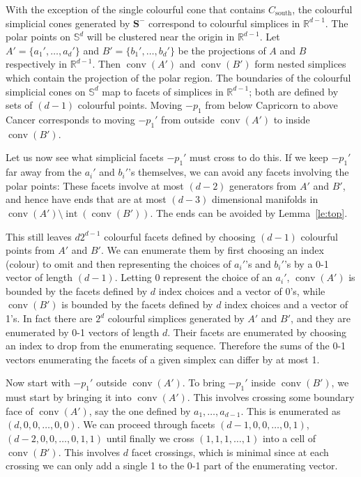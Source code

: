 \documentclass[epsbox,12pt,reqno]{amsart}
\theoremstyle{definition}
\theoremstyle{remark}
\def\S{\mathbf{S}}
\def\conv{\operatorname{conv}}
\def\south{\operatorname{south}}
\def\interior{\operatorname{int}}
\def\R{\mathbb{R}}
\def\Sph{\mathbb{S}}
\begin{document}
With the exception of the single colourful cone that contains
$C_{\south}$, the colourful simplicial cones generated by $\S^\minus$
correspond to colourful simplices in $\R^{d-1}$.  
The polar points on $\Sph^d$ will be clustered near the origin
in $\R^{d-1}$.  Let $A'=\{a_1', \ldots, a_d'\}$ and 
$B'=\{b_1', \ldots, b_d'\}$ be the projections of $A$ and $B$
respectively in $\R^{d-1}$.  
Then $\conv(A')$ and $\conv(B')$ form nested simplices which contain
the projection of the polar region.   The boundaries of the colourful 
simplicial cones on $\Sph^d$ map to facets of simplices in $\R^{d-1}$;
both are defined by sets of $(d-1)$ colourful points.
Moving $-p_1$ from below Capricorn to above
Cancer corresponds to moving $-p_1'$ from outside $\conv(A')$ to
inside $\conv(B')$.

Let us now see what simplicial facets $-p_1'$ must cross to do this.
If we keep $-p_1'$ far away from the $a_i'$ and $b_i'$'s themselves,
we can avoid any facets involving the polar points: These facets
involve at most $(d-2)$ generators from $A'$ and $B'$, and hence have
ends that are at most $(d-3)$ dimensional manifolds in 
$\conv(A') \setminus \interior(\conv(B'))$.  The ends can be avoided by
Lemma~\ref{le:top}. 

This still leaves $d 2^{d-1}$ colourful facets defined by choosing
$(d-1)$ colourful points from $A'$ and $B'$.  We can enumerate them by
first choosing an index (colour) to omit and then representing the
choices of $a_i'$'s and $b_i'$'s by a 0-1 vector of length $(d-1)$.  
Letting 0 represent the choice of an $a_i'$, $\conv(A')$ is bounded by
the facets defined by $d$ index choices and a vector of 0's, while
$\conv(B')$ is bounded by the facets defined by $d$ index choices 
and a vector of 1's.  In fact there are $2^d$ colourful simplices 
generated by $A'$ and $B'$, and they are enumerated by 0-1 vectors of 
length $d$.  Their facets are enumerated by choosing an
index to drop from the enumerating sequence.  Therefore the sums
of the 0-1 vectors enumerating the facets of a given simplex
can differ by at most 1.

Now start with $-p_1'$ outside $\conv(A')$.  
To bring $-p_1'$ inside $\conv(B')$, we must start by bringing it
into $\conv(A')$.  This involves crossing some boundary face of
$\conv(A')$, say the one defined by $a_1, \ldots, a_{d-1}$.  
This is enumerated as $(d,0,0,\ldots,0,0)$.  We can proceed through
facets $(d-1,0,0,\ldots,0,1)$, $(d-2,0,0,\ldots,0,1,1)$
until finally we cross $(1,1,1, \ldots, 1)$ into a cell of $\conv(B')$.
This involves $d$ facet crossings, which is minimal since at
each crossing we can only add a single 1 to the 0-1 part
of the enumerating vector.
\end{document}
